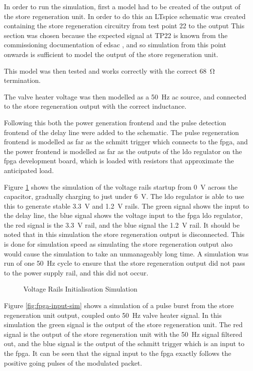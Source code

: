 In order to run the simulation, first a model had to be created of the output of the store regeneration unit. In order to do this an LTspice schematic was created containing the store regeneration circuitry from test point 22 to the output This section was chosen because the expected signal at TP22 is known from the commissioning documentation of \gls{edsac} \cite[p.7]{linnington2016b}, and so simulation from this point onwards is sufficient to model the output of the store regeneration unit.

This model was then tested and works correctly with the correct \SI{68}{\ohm} termination.

The valve heater voltage was then modelled as a \SI{50}{\hertz} \gls{ac} source, and connected to the store regeneration output with the correct inductance.

Following this both the power generation frontend and the pulse detection frontend of the delay line were added to the schematic. The pulse regeneration frontend is modelled as far as the schmitt trigger which connects to the \gls{fpga}, and the power frontend is modelled as far as the outputs of the \gls{ldo} regulator on the \gls{fpga} development board, which is loaded with resistors that approximate the anticipated load.

Figure \ref{fig:psu-init} shows the simulation of the voltage rails startup from \SI{0}{\volt} across the capacitor, gradually charging to just under \SI{6}{\volt}. The \gls{ldo} regulator is able to use this to generate stable \SI{3.3}{\volt} and \SI{1.2}{\volt} rails. The green signal shows the input to the delay line, the blue signal shows the voltage input to the \gls{fpga} \gls{ldo} regulator, the red signal is the \SI{3.3}{\volt} rail, and the blue signal the \SI{1.2}{\volt} rail. It should be noted that in this simulation the store regeneration output is disconnected. This is done for simulation speed as simulating the store regeneration output also would cause the simulation to take an unmanageably long time. A simulation was run of one \SI{50}{\hertz} cycle to ensure that the store regeneration output did not pass to the power supply rail, and this did not occur.

\begin{figure}[ht]
	\centering
	\caption{Voltage Rails Initialisation Simulation}
	\label{fig:psu-init}
\end{figure}

Figure \ref{fig:fpga-input-sim} shows a simulation of a pulse burst from the store regeneration unit output, coupled onto \SI{50}{\hertz} valve heater signal. In this simulation the green signal is the output of the store regeneration unit. The red signal is the output of the store regeneration unit with the \SI{50}{\hertz} signal filtered out, and the blue signal is the output of the schmitt trigger which is an input to the \gls{fpga}. It can be seen that the signal input to the \gls{fpga} exactly follows the positive going pulses of the modulated packet.


